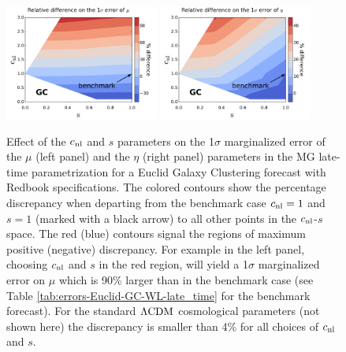 \begin{figure}[htbp]
\centering{}
\includegraphics[width=0.45\textwidth]{Chapters/linear-nonlinear-MG-forecasts/figures/DensityPlots/GC-Zhao-effect-mu.pdf}
\includegraphics[width=0.45\textwidth]{Chapters/linear-nonlinear-MG-forecasts/figures/DensityPlots/GC-Zhao-effect-eta.pdf}
\caption[Effect of the HS non-linear prescription on parameter estimation for GC in MG.]{\label{fig:Density-GC-HSpars}Effect
of the $c_{\mathrm{nl}}$ and $s$ parameters
on the 1$\sigma$ marginalized error of the $\mu$ (left panel) and the
$\eta$ (right panel) parameters
in the MG late-time parametrization for a Euclid Galaxy Clustering
forecast with Redbook specifications. The colored contours show the percentage discrepancy when
departing from the benchmark case $c_{\mathrm{nl}}=1$ and $s=1$ (marked with
a black arrow) to all other points in the $c_{\mathrm{nl}}$-$s$
space. The red (blue) contours signal the regions of maximum positive (negative) discrepancy.
For example in the left panel, choosing $c_{\mathrm{nl}}$ and $s$ in the
red region, will yield a 1$\sigma$ marginalized error on $\mu$
which is 90\% larger than in the benchmark case (see Table
\ref{tab:errors-Euclid-GC-WL-late_time}
for the benchmark forecast). For the standard $\Lambda\mathrm{CDM}$ cosmological
parameters (not shown here) the discrepancy is smaller than 4\% for all choices of $c_{\mathrm{nl}}$ and $s$.
}
\end{figure}


